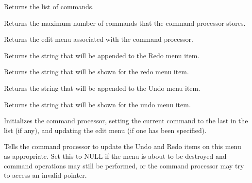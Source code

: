 
Returns the list of commands.



Returns the maximum number of commands that the command processor stores.



Returns the edit menu associated with the command processor.

\label{wxcommandprocessorgetredoaccelerator}


Returns the string that will be appended to the Redo menu item.

\label{wxcommandprocessorgetredomenulabel}


Returns the string that will be shown for the redo menu item.

\label{wxcommandprocessorgetundoaccelerator}


Returns the string that will be appended to the Undo menu item.

\label{wxcommandprocessorgetundomenulabel}


Returns the string that will be shown for the undo menu item.



Initializes the command processor, setting the current command to the
last in the list (if any), and updating the edit menu (if one has been
specified).



Tells the command processor to update the Undo and Redo items on this
menu as appropriate. Set this to NULL if the menu is about to be
destroyed and command operations may still be performed, or the command
processor may try to access an invalid pointer.

